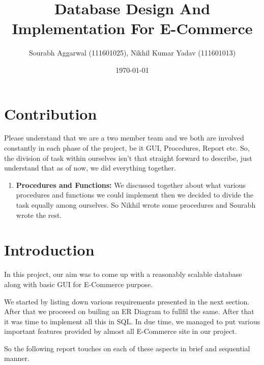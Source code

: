 \documentclass[a4paper,12pt]{article}
\newcommand{\bfa}[1]{
    \textbf{#1}
}
\begin{document}
\title{Database Design And Implementation For E-Commerce}
\author{\small{Sourabh Aggarwal (111601025), Nikhil Kumar Yadav (111601013)}}
\date{\today}
\maketitle
{}
\tableofcontents
\newpage
{}
\section{Contribution}
Please understand that we are a two member team and we both are involved constantly in each phase of the project, be it GUI, Procedures, Report etc. So, the division of task within ourselves isn't that straight forward to describe, just understand that as of now, we did everything together.
\begin{enumerate}
  \item \bfa{Procedures and Functions:}We discussed together about what various procedures and functions we could implement then we decided to divide the task equally among ourselves. So Nikhil wrote some procedures and Sourabh wrote the rest.
\end{enumerate}
\section{Introduction}
In this project, our aim was to come up with a reasonably scalable database along with basic GUI for E-Commerce purpose.

We started by listing down various requirements presented in the next section. After that we proceeed on builing an ER Diagram to fullfil the same. After that it was time to implement all this in SQL. In due time, we managed to put various important features provided by almost all E-Commerce site in our project. 

So the following report touches on each of these aspects in brief and sequential manner. 
\end{document}
